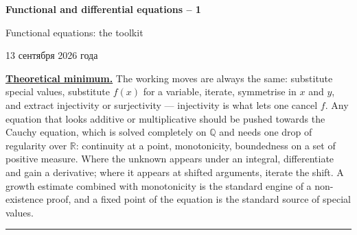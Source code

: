 \documentclass[11pt,a4paper]{article}
\newcommand{\head}[1]{\par\medskip\noindent\textbf{\underline{#1}}\quad}
\newcommand{\sheettitle}[4]{%
  \begin{center}
  {\huge\bfseries #1\par}\vspace{1.2em}
  {\Large #2\par}\vspace{0.8em}
  \if\relax\detokenize{#3}\relax\else{\Large #3\par}\vspace{0.8em}\fi
  {\foreignlanguage{russian}{#4}\par}
  \end{center}\vspace{0.5em}}
\begin{document}
\sheettitle{Functional and differential equations -- 1}{Functional equations: the toolkit}{Homework}{13 сентября 2026 года}

\head{Theoretical minimum.} The working moves are always the same: substitute special values,
substitute $f(x)$ for a variable, iterate, symmetrise in $x$ and $y$, and extract injectivity or
surjectivity --- injectivity is what lets one cancel $f$. Any equation that looks additive or
multiplicative should be pushed towards the Cauchy equation, which is solved completely on $\mathbb Q$
and needs one drop of regularity over $\mathbb R$: continuity at a point, monotonicity, boundedness on a
set of positive measure. Where the unknown appears under an integral, differentiate and gain a
derivative; where it appears at shifted arguments, iterate the shift. A growth estimate combined with
monotonicity is the standard engine of a non-existence proof, and a fixed point of the equation is the
standard source of special values.

\medskip\noindent\rule{\linewidth}{0.4pt}
\end{document}
